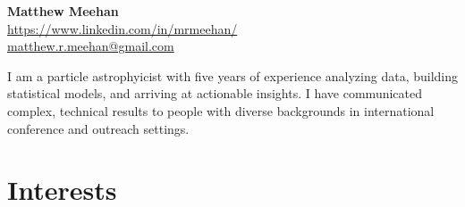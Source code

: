 \documentclass[letterpaper,11pt]{article}
\begin{document}

\begin{center}

    \textbf{\Large Matthew Meehan}\\
    \href{https://www.linkedin.com/in/mrmeehan/}{\faLinkedinSquare}
    \href{https://www.linkedin.com/in/mrmeehan/}{ https://www.linkedin.com/in/mrmeehan/}\\
    \href{mailto:matthew.r.meehan@gmail.com}{\faEnvelopeO}
    \href{mailto:matthew.r.meehan@gmail.com}{matthew.r.meehan@gmail.com}\\

\end{center}

%


I am a particle astrophyicist with five years of experience analyzing data, building statistical models, and arriving at actionable insights. 
I have communicated complex, technical results to people with diverse backgrounds in international conference and outreach settings.


\section{Interests}
\end{document}
